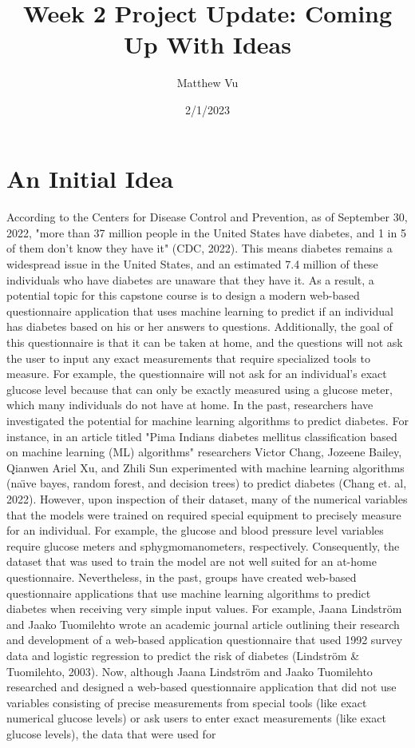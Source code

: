 \documentclass[11pt]{article}
\title{Week 2 Project Update: Coming Up With Ideas}
\author{Matthew Vu}
\date{2/1/2023}
\begin{document}
	
	\maketitle
	
	\section*{An Initial Idea}
	\paragraph{}
	According to the Centers for Disease Control and Prevention\cite{cdc}, as of September 30, 2022, "more than 37 million people in the United States have diabetes, and 1 in 5 of them don’t know they have it" (CDC, 2022).  This means diabetes remains a widespread issue in the United States, and an estimated 7.4 million of these individuals who have diabetes are unaware that they have it.  As a result, a potential topic for this capstone course is to design a modern web-based questionnaire application that uses machine learning to predict if an individual has diabetes based on his or her answers to questions.  Additionally, the goal of this questionnaire is that it can be taken at home, and the questions will not ask the user to input any exact measurements that require specialized tools to measure.  For example, the questionnaire will not ask for an individual’s exact glucose level because that can only be exactly measured using a glucose meter, which many individuals do not have at home.  In the past, researchers have investigated the potential for machine learning algorithms to predict diabetes.  For instance, in an article titled "Pima Indians diabetes mellitus classification based on machine learning (ML) algorithms"\cite{pima} researchers Victor Chang, Jozeene Bailey, Qianwen Ariel Xu, and Zhili Sun experimented with machine learning algorithms (na{\"\i}ve bayes, random forest, and decision trees) to predict diabetes (Chang et. al, 2022).  However, upon inspection of their dataset, many of the numerical variables that the models were trained on required special equipment to precisely measure for an individual.  For example, the glucose and blood pressure level variables require glucose meters and sphygmomanometers, respectively.  Consequently, the dataset that was used to train the model are not well suited for an at-home questionnaire.  Nevertheless, in the past, groups have created web-based questionnaire applications that use machine learning algorithms to predict diabetes when receiving very simple input values.  For example, Jaana Lindstr{\"o}m and Jaako Tuomilehto\cite{app} wrote an academic journal article outlining their research and development of a web-based application questionnaire that used 1992 survey data and logistic regression to predict the risk of diabetes (Lindstr{\"o}m \& Tuomilehto, 2003).  Now, although Jaana Lindstr{\"o}m and Jaako Tuomilehto researched and designed a web-based questionnaire application that did not use variables consisting of precise measurements from special tools (like exact numerical glucose levels) or ask users to enter exact measurements (like exact glucose levels), the data that were used for 
\end{document}
